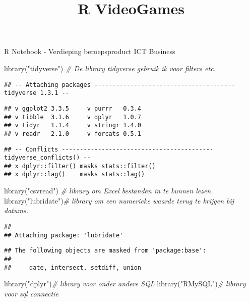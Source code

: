 \documentclass[
]{article}
\title{R VideoGames}
\author{}
\date{\vspace{-2.5em}}
\newenvironment{Shaded}{\begin{snugshade}}{\end{snugshade}}
\newcommand{\CommentTok}[1]{\textcolor[rgb]{0.56,0.35,0.01}{\textit{#1}}}
\newcommand{\FunctionTok}[1]{\textcolor[rgb]{0.00,0.00,0.00}{#1}}
\newcommand{\NormalTok}[1]{#1}
\newcommand{\StringTok}[1]{\textcolor[rgb]{0.31,0.60,0.02}{#1}}
\begin{document}
\maketitle

R Notebook - Verdieping beroepsproduct ICT Business

\begin{Shaded}
\begin{Highlighting}[]
\FunctionTok{library}\NormalTok{(}\StringTok{"tidyverse"}\NormalTok{) }\CommentTok{\# De library tidyverse gebruik ik voor filters etc.}
\end{Highlighting}
\end{Shaded}

\begin{verbatim}
## -- Attaching packages --------------------------------------- tidyverse 1.3.1 --
\end{verbatim}

\begin{verbatim}
## v ggplot2 3.3.5     v purrr   0.3.4
## v tibble  3.1.6     v dplyr   1.0.7
## v tidyr   1.1.4     v stringr 1.4.0
## v readr   2.1.0     v forcats 0.5.1
\end{verbatim}

\begin{verbatim}
## -- Conflicts ------------------------------------------ tidyverse_conflicts() --
## x dplyr::filter() masks stats::filter()
## x dplyr::lag()    masks stats::lag()
\end{verbatim}

\begin{Shaded}
\begin{Highlighting}[]
\FunctionTok{library}\NormalTok{(}\StringTok{"csvread"}\NormalTok{) }\CommentTok{\# library om Excel bestanden in te kunnen lezen.}
\FunctionTok{library}\NormalTok{(}\StringTok{"lubridate"}\NormalTok{)}\CommentTok{\# library om een numerieke waarde terug te krijgen bij datums.}
\end{Highlighting}
\end{Shaded}

\begin{verbatim}
## 
## Attaching package: 'lubridate'
\end{verbatim}

\begin{verbatim}
## The following objects are masked from 'package:base':
## 
##     date, intersect, setdiff, union
\end{verbatim}

\begin{Shaded}
\begin{Highlighting}[]
\FunctionTok{library}\NormalTok{(}\StringTok{"dplyr"}\NormalTok{)}\CommentTok{\# library voor onder andere SQL}
\FunctionTok{library}\NormalTok{(}\StringTok{"RMySQL"}\NormalTok{)}\CommentTok{\# library voor sql connectie}
\end{Highlighting}
\end{Shaded}
\end{document}
